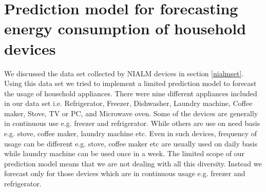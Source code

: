 \section{Prediction model for forecasting energy consumption of household devices}
We discussed the data set collected by NIALM devices in section \ref{nialmset}. Using this data set we tried to implement a limited prediction model to forecast the usage of household appliances. There were nine different appliances included in our data set i.e. Refrigerator, Freezer, Dishwasher, Laundry machine, Coffee maker, Stove, TV or PC, and Microwave oven. Some of the devices are generally in continuous use e.g. freezer and refrigerator. While others are use on need basis e.g. stove, coffee maker, laundry machine etc. Even in such devices, frequency of usage can be different e.g. stove, coffee maker etc are usually used on daily basis while laundry machine can be used once in a week. The limited scope of our prediction model means that we are not dealing with all this diversity. Instead we forecast only for those devices which are in continuous usage e.g. freezer and refrigerator.      

    